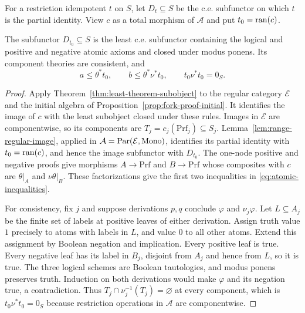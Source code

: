 For a restriction idempotent $t$ on $S$, let $D_t\subseteq S$
be the c.e. subfunctor on which $t$ is the partial identity. View
$c$ as a total morphism of $\mathcal A$ and put $t_0=\operatorname{ran}(c)$.

\begin{theorem}\label{thm:fork-proof-presentation}
The subfunctor $D_{t_0}\subseteq S$ is the least c.e. subfunctor
containing the logical and positive and negative atomic axioms and
closed under modus ponens. Its component theories are consistent,
and
\begin{equation}\label{eq:atomic-inequalities}
 a\le\theta^*t_0,\qquad
 b\le\theta^*\nu^*t_0,\qquad t_0\nu^*t_0=0_S.
\end{equation}
\end{theorem}
\begin{proof}
Apply Theorem~\ref{thm:least-theorem-subobject} to the regular
category $\mathcal E$ and the initial algebra of
Proposition~\ref{prop:fork-proof-initial}. It identifies the image
of $c$ with the least subobject closed under these rules. Images
in $\mathcal E$ are componentwise, so its components are
$T_j=c_j(\mathrm{Prf}_j)\subseteq S_j$.
Lemma~\ref{lem:range-regular-image}, applied in
$\mathcal A=\operatorname{Par}(\mathcal E,\operatorname{Mono})$, identifies its partial identity
with $t_0=\operatorname{ran}(c)$, and hence the image subfunctor with $D_{t_0}$.
The one-node positive and negative proofs give morphisms
$A\to\mathrm{Prf}$ and $B\to\mathrm{Prf}$ whose composites
with $c$ are $\theta|_A$ and $\nu\theta|_B$. These factorizations
give the first two inequalities in \eqref{eq:atomic-inequalities}.

For consistency, fix $j$ and suppose derivations $p,q$ conclude
$\varphi$ and $\nu_j\varphi$. Let $L\subseteq A_j$ be the finite
set of labels at positive leaves of either derivation. Assign truth
value $1$ precisely to atoms with labels in $L$, and value $0$ to
all other atoms. Extend this assignment by Boolean negation and
implication. Every positive leaf is true. Every negative leaf has
its label in $B_j$, disjoint from $A_j$ and hence from $L$, so it
is true. The three logical schemes are Boolean tautologies, and
modus ponens preserves truth. Induction on both derivations would
make $\varphi$ and its negation true, a contradiction. Thus
$T_j\cap\nu_j^{-1}(T_j)=\varnothing$ at every component, which
is $t_0\nu^*t_0=0_S$ because restriction operations in
$\mathcal A$ are componentwise.
\end{proof}


